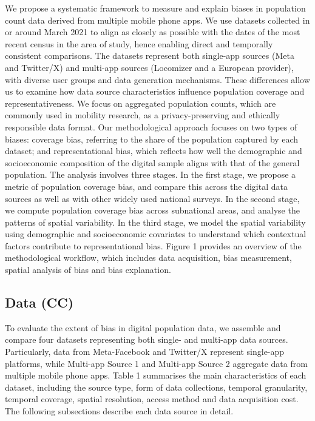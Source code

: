 \documentclass[]{rsos}%
\begin{document}
We propose a systematic framework to measure and explain biases in population count data derived from multiple mobile phone apps. We use datasets collected in or around March 2021 to align as closely as possible with the dates of the most recent census in the area of study, hence enabling direct and temporally consistent comparisons. The datasets represent both single-app sources (Meta and Twitter/X) and multi-app sources (Locomizer and a European provider), with diverse user groups and data generation mechanisms. These differences allow us to examine how data source characteristics influence population coverage and representativeness. We focus on aggregated population counts, which are commonly used in mobility research, as a privacy-preserving and ethically responsible data format. Our methodological approach focuses on two types of biases: coverage bias, referring to the share of the population captured by each dataset; and representational bias, which reflects how well the demographic and socioeconomic composition of the digital sample aligns with that of the general population. The analysis involves three stages. In the first stage, we propose a metric of population coverage bias, and compare this across the digital data sources as well as with other widely used national surveys. In the second stage, we compute population coverage bias across subnational areas, and analyse the patterns of spatial variability. In the third stage, we model the spatial variability using demographic and socioeconomic covariates to understand which contextual factors contribute to representational bias. Figure 1 provides an overview of the methodological workflow, which includes data acquisition, bias measurement, spatial analysis of bias and bias explanation.

\hypertarget{data-cc}{%
\subsection{Data (CC)}\label{data-cc}}

To evaluate the extent of bias in digital population data, we assemble and compare four datasets representing both single- and multi-app data sources. Particularly, data from Meta-Facebook and Twitter/X represent single-app platforms, while Multi-app Source 1 and Multi-app Source 2 aggregate data from multiple mobile phone apps. Table 1 summarises the main characteristics of each dataset, including the source type, form of data collections, temporal granularity, temporal coverage, spatial resolution, access method and data acquisition cost. The following subsections describe each data source in detail.
\end{document}
